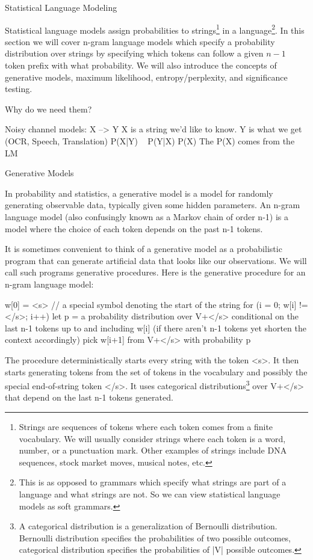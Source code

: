 Statistical Language Modeling

Statistical language models assign probabilities to
strings\footnote{Strings are sequences of tokens where each token
  comes from a finite vocabulary.  We will usually consider strings
  where each token is a word, number, or a punctuation mark.  Other
  examples of strings include DNA sequences, stock market moves,
  musical notes, etc.}  in a language\footnote{This is as opposed to
  grammars which specify what strings are part of a language and what
  strings are not.  So we can view statistical language models as soft
  grammars.}.  In this section we will cover n-gram language models
which specify a probability distribution over strings by specifying
which tokens can follow a given $n-1$ token prefix with what
probability.  We will also introduce the concepts of generative
models, maximum likelihood, entropy/perplexity, and significance
testing.

Why do we need them?

Noisy channel models: X --> Y
X is a string we'd like to know.
Y is what we get (OCR, Speech, Translation)
P(X|Y) ~ P(Y|X) P(X)
The P(X) comes from the LM


Generative Models

In probability and statistics, a generative model is a model for
randomly generating observable data, typically given some hidden
parameters.  An n-gram language model (also confusingly known as a
Markov chain of order n-1) is a model where the choice of each token
depends on the past n-1 tokens.

It is sometimes convenient to think of a generative model as a
probabilistic program that can generate artificial data that looks
like our observations.  We will call such programs generative
procedures.  Here is the generative procedure for an n-gram language
model:

w[0] = <s>  // a special symbol denoting the start of the string
for (i = 0; w[i] != </s>; i++) {
  let p = a probability distribution over V+</s> conditional on the
  last n-1 tokens up to and including w[i] (if there aren't n-1 tokens
  yet shorten the context accordingly)
  pick w[i+1] from V+</s> with probability p
}

The procedure deterministically starts every string with the token
<s>.  It then starts generating tokens from the set of tokens in the
vocabulary and possibly the special end-of-string token </s>.  It uses
categorical distributions\footnote{A categorical distribution is a
  generalization of Bernoulli distribution.  Bernoulli distribution
  specifies the probabilities of two possible outcomes, categorical
  distribution specifies the probabilities of |V| possible outcomes.}
over V+</s> that depend on the last n-1 tokens generated.


